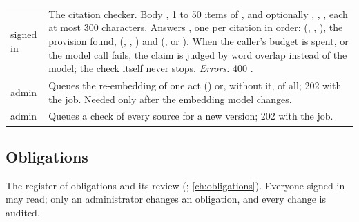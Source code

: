 \begin{xltabular}{\textwidth}{@{}L{19mm}Y@{}}
signed in & The citation checker. Body , 1 to 50 items of ,
   and optionally , , , each at
  most 300 characters. Answers , one per citation in order: 
  (, , ), the provision found,
   (, , ) and 
  (,  or ). When the caller's budget is spent, or the
  model call fails, the claim is judged by word overlap instead of the model; the check itself
  never stops. \emph{Errors:}
  400 . \\
\addlinespace
{}
admin & Queues the re-embedding of one act () or, without it, of all; 202
  with the job. Needed only after the embedding model changes. \\
\addlinespace
{}
admin & Queues a check of every source for a new version; 202 with the job. \\
\end{xltabular}

\subsection{Obligations}\label{sec:api:obligations}

The register of obligations and its review (;
\cref{ch:obligations}). Everyone signed in may read; only an administrator changes an
obligation, and every change is audited.

